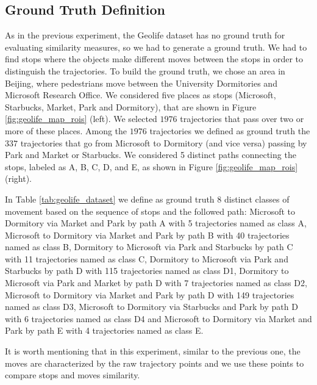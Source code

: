 \subsection{Ground Truth Definition}
{As in the previous experiment, the Geolife dataset has no ground truth for evaluating similarity measures, so we had to generate a ground truth. We had to find stops where the objects make different moves between the stops in order to distinguish the trajectories.}
To build the ground truth, we chose an area in Beijing, where pedestrians move between the University Dormitories and Microsoft Research Office. We considered five places as stops (Microsoft, Starbucks, Market, Park and Dormitory), that are shown in Figure \ref{fig:geolife_map_rois} (left). {We selected $1976$ trajectories that pass over two or more of these places. Among the $1976$ trajectories we defined as ground truth the $337$ trajectories that go from Microsoft to Dormitory (and vice versa) passing by Park and Market or Starbucks.} We considered 5 distinct paths connecting the stops, labeled as A, B, C, D, and E, as shown in Figure \ref{fig:geolife_map_rois} (right).

In Table \ref{tab:geolife_dataset} we define as ground truth 8 distinct classes of movement based on the sequence of stops and the followed path: Microsoft to Dormitory via Market and Park by path A with 5 trajectories named as class A, Microsoft to Dormitory via Market and Park by path B with 40 trajectories named as class B, Dormitory to Microsoft via Park and Starbucks by path C with 11 trajectories named as class C, Dormitory to Microsoft via Park and Starbucks by path D with 115 trajectories named as class D1, Dormitory to Microsoft via Park and Market by path D with 7 trajectories named as class D2, Microsoft to Dormitory via Market and Park by path D with 149 trajectories named as class D3, Microsoft to Dormitory via Starbucks and Park by path D with 6 trajectories named as class D4 and Microsoft to Dormitory via Market and Park by path E with 4 trajectories named as class E.

It is worth mentioning that in this experiment, similar to the previous one, the moves are characterized by the raw trajectory points and we use these points to compare stops and moves similarity.

